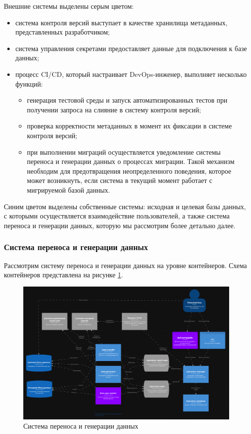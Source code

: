 Внешние системы выделены серым цветом:
\begin{itemize}
\item система контроля версий выступает в качестве хранилища метаданных, представленных разработчиком;
\item система управления секретами предоставляет данные для подключения к базе данных;
\item процесс CI/CD, который настраивает DevOps-инженер, выполняет несколько функций:
  \begin{itemize}
    \item генерация тестовой среды и запуск автоматизированных тестов при получении запроса на слияние в систему контроля версий;
    \item проверка корректности метаданных в момент их фиксации в системе контроля версий;
    \item при выполнении миграций осуществляется уведомление системы переноса и генерации данных о процессах миграции. Такой механизм необходим для предотвращения неопределенного поведения, которое может возникнуть, если система в текущий момент работает с мигрируемой базой данных.
  \end{itemize}
\end{itemize}

Синим цветом выделены собственные системы: исходная и целевая базы данных, с которыми осуществляется взаимодействие пользователей, а также система переноса и генерации данных, которую мы рассмотрим более детально далее.

\subsubsection{Система переноса и генерации данных}

Рассмотрим систему переноса и генерации данных на уровне контейнеров. Схема контейнеров представлена на рисунке \ref{Containers}.

\begin{figure}
  \includegraphics[scale=0.12]{./img/structurizr-Containers.png}
  \caption{Система переноса и генерации данных}
  \label{Containers}
\end{figure}


